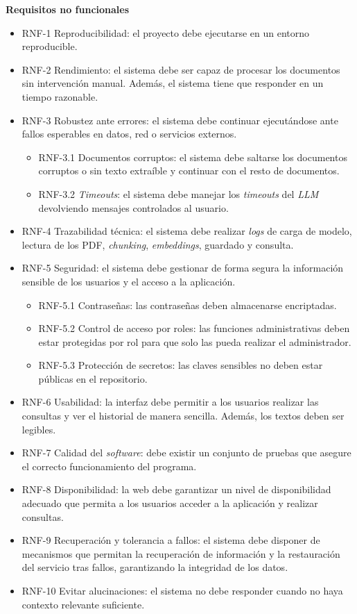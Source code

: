 \textbf{Requisitos no funcionales}
\begin{itemize}
\tightlist
	\item RNF-1 Reproducibilidad: el proyecto debe ejecutarse en un entorno reproducible.
	\item RNF-2 Rendimiento: el sistema debe ser capaz de procesar los documentos sin intervención manual. Además, el sistema tiene que responder en un tiempo razonable.
	\item RNF-3 Robustez ante errores: el sistema debe continuar ejecutándose ante fallos esperables en datos, red o servicios externos.
	\begin{itemize}
	\tightlist
		\item RNF-3.1 Documentos corruptos: el sistema debe saltarse los documentos corruptos o sin texto extraíble y continuar con el resto de documentos.
		\item RNF-3.2 \textit{Timeouts}: el sistema debe manejar los \textit{timeouts} del \textit{LLM} devolviendo mensajes controlados al usuario.
	\end{itemize}
	\item RNF-4 Trazabilidad técnica: el sistema debe realizar \textit{logs} de carga de modelo, lectura de los PDF, \textit{chunking}, \textit{embeddings}, guardado y consulta.
	\item RNF-5 Seguridad: el sistema debe gestionar de forma segura la información sensible de los usuarios y el acceso a la aplicación.
	\begin{itemize}
	\tightlist
		\item RNF-5.1 Contraseñas: las contraseñas deben almacenarse encriptadas.
		\item RNF-5.2 Control de acceso por roles: las funciones administrativas deben estar protegidas por rol para que solo las pueda realizar el administrador.
		\item RNF-5.3 Protección de secretos: las claves sensibles no deben estar públicas en el repositorio.
	\end{itemize}
	\item RNF-6 Usabilidad: la interfaz debe permitir a los usuarios realizar las consultas y ver el historial de manera sencilla. Además, los textos deben ser legibles.
	\item RNF-7 Calidad del \textit{software}: debe existir un conjunto de pruebas que asegure el correcto funcionamiento del programa. 
	\item RNF-8 Disponibilidad: la web debe garantizar un nivel de disponibilidad adecuado que permita a los usuarios acceder a la aplicación y realizar consultas.
	\item RNF-9 Recuperación y tolerancia a fallos: el sistema debe disponer de mecanismos que permitan la recuperación de información y la restauración del servicio tras fallos, garantizando la integridad de los datos.
	\item RNF-10 Evitar alucinaciones: el sistema no debe responder cuando no haya contexto relevante suficiente.
\end{itemize}


